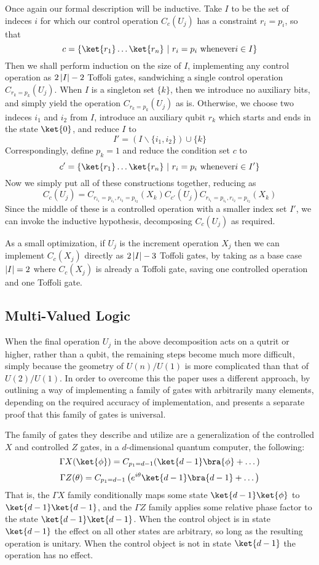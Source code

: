 Once again our formal description will be inductive. Take $I$ to be the set of indeces $i$ for which our control operation $C_c(U_j)$ has a constraint $r_i = p_i$, so that
\[c = \{\ket{r_1}\dots\ket{r_n}\ |\ r_i = p_i \text{\ whenever} i \in I\}\]
Then we shall perform induction on the size of $I$, implementing any control operation as $2\left| I \right|-2$ Toffoli gates, sandwiching a single control operation $C_{r_k=p_k}(U_j)$. When $I$ is a singleton set $\{k\}$, then we introduce no auxiliary bits, and simply yield the operation $C_{r_k=p_k}(U_j)$ as is. Otherwise, we choose two indeces $i_1$ and $i_2$ from $I$, introduce an auxiliary qubit $r_k$ which starts and ends in the state $\ket{0}$, and reduce $I$ to
\[I' = (I \backslash \{i_1, i_2\})\cup \{k\}\]
Correspondingly, define $p_k = 1$ and reduce the condition set $c$ to
\[c' = \{\ket{r_1}\dots\ket{r_n}\ |\ r_i = p_i \text{\ whenever} i \in I'\}\]
Now we simply put all of these constructions together, reducing as
\[C_c(U_j) = C_{r_{i_1}=p_{i_1},r_{i_2}=p_{i_2}}(X_k)
C_{c'}(U_j)
C_{r_{i_1}=p_{i_1},r_{i_2}=p_{i_2}}(X_k)\]
Since the middle of these is a controlled operation with a smaller index set $I'$, we can invoke the inductive hypothesis, decomposing $C_c(U_j)$ as required.

As a small optimization, if $U_j$ is the increment operation $X_j$ then we can implement $C_c(X_j)$ directly as $2\left| I \right| - 3$ Toffoli gates, by taking as a base case $\left| I \right| = 2$ where $C_c(X_j)$ is already a Toffoli gate, saving one controlled operation and one Toffoli gate.
\subsection{Multi-Valued Logic}
When the final operation $U_j$ in the above decomposition acts on a qutrit or higher, rather than a qubit, the remaining steps become much more difficult, simply because the geometry of $U(n)/U(1)$ is more complicated than that of $U(2)/U(1)$. In order to overcome this the paper \cite{multi-valued-logic} uses a different approach, by outlining a way of implementing a family of gates with arbitrarily many elements, depending on the required accuracy of implementation, and presents a separate proof that this family of gates is universal.

The family of gates they describe and utilize are a generalization of the controlled $X$ and controlled $Z$ gates, in a $d$-dimensional quantum computer, the following:
\[\Gamma X(\ket{\phi}) = C_{p_1 = d-1}(\ket{d-1}\bra{\phi} + \dots)\]
\[\Gamma Z(\theta) = C_{p_1 = d-1}\left(e^{i\theta}\ket{d-1}\bra{d-1} + \dots\right)\]
That is, the $\Gamma X$ family conditionally maps some state $\ket{d-1}\ket{\phi}$ to $\ket{d-1}\ket{d-1}$, and the $\Gamma Z$ family applies some relative phase factor to the state $\ket{d-1}\ket{d-1}$. When the control object is in state $\ket{d-1}$ the effect on all other states are arbitrary, so long as the resulting operation is unitary. When the control object is not in state $\ket{d-1}$ the operation has no effect.

